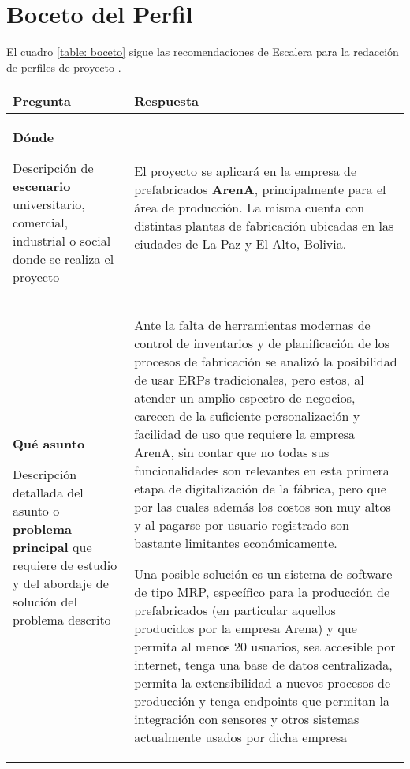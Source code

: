 \section{Boceto del Perfil}

El cuadro \ref{table: boceto} sigue las recomendaciones de Escalera para la redacción de perfiles de proyecto \cite{escaleraTECNICASIDCIENCIAS2006}.

\begin{table}[htbp]
    \centering
    \begin{tabular}{p{}p{}}\toprule
        Pregunta & Respuesta \\ \midrule
        \textbf{Dónde}

        {\tiny Descripción de \textbf{escenario} universitario, comercial, industrial o social donde se realiza el proyecto} &

        El proyecto se aplicará en la empresa de prefabricados \mbox{\textbf{ArenA}}, principalmente para el área de producción. La misma cuenta con distintas plantas de fabricación ubicadas en las ciudades de La Paz y El Alto, Bolivia.\\

        \textbf{Qué asunto}

        {\tiny Descripción detallada del asunto o \textbf{problema principal} que requiere de estudio y del abordaje de solución del problema descrito} &

        Ante la falta de herramientas modernas de control de inventarios y de planificación de los procesos de fabricación se analizó la posibilidad de usar ERPs tradicionales, pero estos, al atender un amplio espectro de negocios, carecen de la suficiente personalización y facilidad de uso que requiere la empresa ArenA, sin contar que no todas sus funcionalidades son relevantes en esta primera etapa de digitalización de la fábrica, pero que por las cuales además los costos son muy altos y al pagarse por usuario registrado son bastante limitantes económicamente.

        Una posible solución es un sistema de software de tipo MRP, específico para la producción de prefabricados (en particular aquellos producidos por la empresa Arena) y que permita al menos 20 usuarios, sea accesible por internet, tenga una base de datos centralizada, permita la extensibilidad a nuevos procesos de producción y tenga endpoints que permitan la integración con sensores y otros sistemas actualmente usados por dicha empresa\\


\end{tabular}
\end{table}
